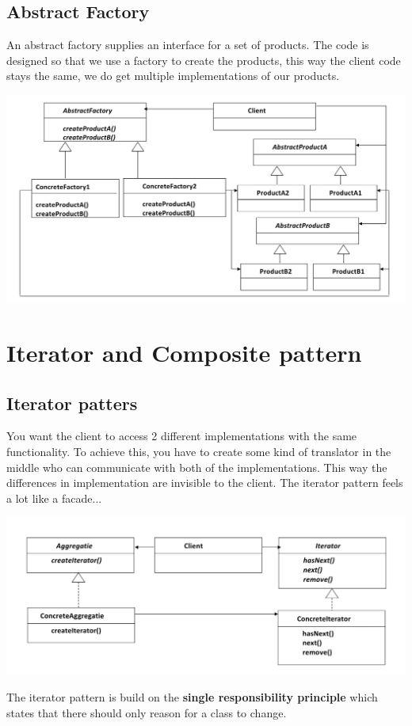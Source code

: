 \documentclass{report}
\begin{document}
   		\section{Abstract Factory}
   			An abstract factory supplies an interface for a set of products. The code is designed so that we use a factory to create the products, this way the client code stays the same, we do get multiple implementations of our products.
   			\begin{center}
   				\includegraphics[scale=0.3]{abstract_factory}
   			\end{center}
   	\chapter{Iterator and Composite pattern}
   		\section{Iterator patters}
   			You want the client to access 2 different implementations with the same functionality. To achieve this, you have to create some kind of translator in the middle who can communicate with both of the implementations. This way the differences in implementation are invisible to the client. The iterator pattern feels a lot like a facade...
   			\begin{center}
   				\includegraphics[scale=0.3]{iterator}
   			\end{center}
   			The iterator pattern is build on the \textbf{single responsibility principle} which states that there should only reason for a class to change.
   			\pagebreak
\end{document}
